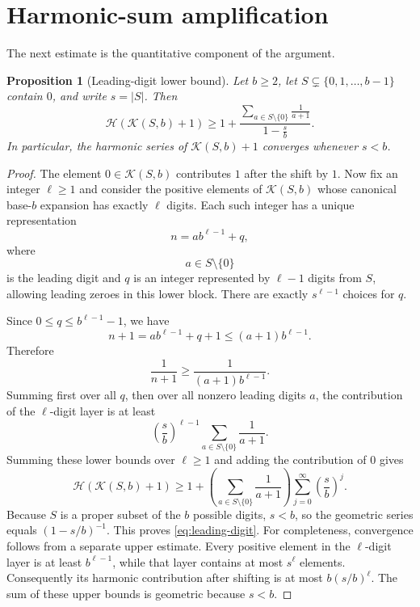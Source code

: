\documentclass[11pt]{article}
\newtheorem{proposition}[theorem]{Proposition}
\theoremstyle{definition}
\theoremstyle{remark}
\newcommand{\HH}{\mathcal{H}}
\newcommand{\Kemp}{\mathcal{K}}
\begin{document}
\section{Harmonic-sum amplification}

The next estimate is the quantitative component of the argument.

\begin{proposition}[Leading-digit lower bound]\label{prop:leading-digit}
Let $b\ge 2$, let $S\subsetneq\{0,1,\ldots,b-1\}$ contain $0$, and write
$s=|S|$.  Then
\begin{equation}\label{eq:leading-digit}
 \HH(\Kemp(S,b)+1)
 \ge
 1+\frac{\displaystyle
     \sum_{a\in S\setminus\{0\}}\frac1{a+1}}
          {\displaystyle 1-\frac{s}{b}}.
\end{equation}
In particular, the harmonic series of $\Kemp(S,b)+1$ converges whenever
$s<b$.
\end{proposition}

\begin{proof}
The element $0\in\Kemp(S,b)$ contributes $1$ after the shift by $1$.
Now fix an integer $\ell\ge 1$ and consider the positive elements of
$\Kemp(S,b)$ whose canonical base-$b$ expansion has exactly $\ell$ digits.
Each such integer has a unique representation
\[
 n=ab^{\ell-1}+q,
\]
where
\[
 a\in S\setminus\{0\}
\]
is the leading digit and $q$ is an integer represented by $\ell-1$ digits
from $S$, allowing leading zeroes in this lower block.  There are exactly
$s^{\ell-1}$ choices for $q$.

Since $0\le q\le b^{\ell-1}-1$, we have
\[
 n+1=ab^{\ell-1}+q+1
 \le (a+1)b^{\ell-1}.
\]
Therefore
\[
 \frac1{n+1}
 \ge
 \frac{1}{(a+1)b^{\ell-1}}.
\]
Summing first over all $q$, then over all nonzero leading digits $a$, the
contribution of the $\ell$-digit layer is at least
\[
 \left(\frac{s}{b}\right)^{\ell-1}
 \sum_{a\in S\setminus\{0\}}\frac1{a+1}.
\]
Summing these lower bounds over $\ell\ge 1$ and adding the contribution of
$0$ gives
\[
 \HH(\Kemp(S,b)+1)
 \ge
 1+
 \left(\sum_{a\in S\setminus\{0\}}\frac1{a+1}\right)
 \sum_{j=0}^{\infty}\left(\frac{s}{b}\right)^j.
\]
Because $S$ is a proper subset of the $b$ possible digits, $s<b$, so the
geometric series equals $(1-s/b)^{-1}$.  This proves
\cref{eq:leading-digit}.  For completeness, convergence follows from a separate upper estimate.
Every positive element in the $\ell$-digit layer is at least
$b^{\ell-1}$, while that layer contains at most $s^\ell$ elements.
Consequently its harmonic contribution after shifting is at most
$b(s/b)^\ell$.  The sum of these upper bounds is geometric because
$s<b$.
\end{proof}
\end{document}

